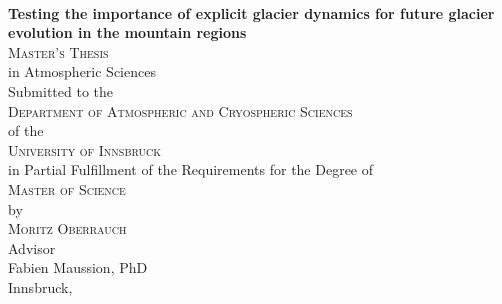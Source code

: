 \begin{titlepage}
\begin{center}

~\\[15mm]
{\Huge  {\bf Testing the importance of explicit glacier dynamics for
future glacier evolution in the mountain regions}}\\[5mm]




{\Large \textsc{Master's Thesis}} \\[15mm]


{\large in Atmospheric Sciences} \\[15mm]


{\large Submitted to the} \\[2mm]
{\Large \textsc{Department of Atmospheric and Cryospheric Sciences}} \\[2mm]
{\large of the} \\[2mm]
{\Large \textsc{University of Innsbruck}} \\[15mm]


{\large in Partial Fulfillment of the Requirements for the Degree of} \\[2mm]
{\Large \textsc{Master of Science}} \\[15mm]


{\large by} \\[2mm]
{\Large \textsc{Moritz Oberrauch}} \\[15mm]


{\large Advisor} \\[2mm]
{\large Fabien Maussion, PhD} \\[15mm]


{\large Innsbruck, \monthyeardate{\today}}


\end{center}
\end{titlepage}
